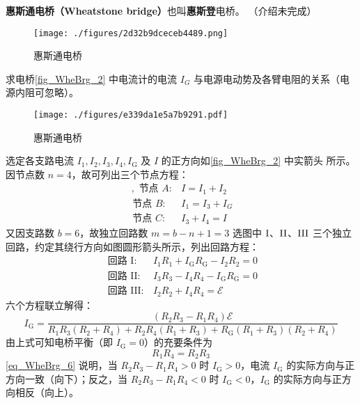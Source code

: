 

\textbf{惠斯通电桥（Wheatstone bridge）}也叫\textbf{惠斯登}电桥。 （介绍未完成）

\begin{figure}[ht]
\centering
\texttt{[image: ./figures/2d32b9dceceb4489.png]}
\caption{惠斯通电桥} \label{fig_WheBrg_1}
\end{figure}

求电桥\autoref{fig_WheBrg_2} 中电流计的电流 $I_G$ 与电源电动势及各臂电阻的关系（电源内阻可忽略）。
\begin{figure}[ht]
\centering
\texttt{[image: ./figures/e339da1e5a7b9291.pdf]}
\caption{惠斯通电桥} \label{fig_WheBrg_2}
\end{figure}

选定各支路电流 $I_{1}, I_{2}, I_{3}, I_{4}, I_{\mathrm{G}}$ 及 $I $ 的正方向如\autoref{fig_WheBrg_2} 中实箭头
所示。因节点数 $n = 4$，故可列出三个节点方程：
\begin{equation}
\begin{array}{ll}~,\text { 节点 } A: & I=I_{1}+I_{2} \\ \text { 节点 } B: & I_{1}=I_{3}+I_{G} \\ \text { 节点 } C: & I_{3}+I_{4}=I\end{array}
\end{equation}
又因支路数 $b=6$，故独立回路数 $m=b-n+1=3$ 选图中 $\rm I$、$\rm II$、$\rm III$ 三个独立回路，约定其绕行方向如图圆形箭头所示，列出回路方程：
\begin{equation}
\begin{array}{ll}\text { 回路 } \mathrm{I}: & I_{1} R_{1}+I_{\mathrm{G}} R_{\mathrm{G}}-I_{2} R_{2}=0 \\ \text { 回路 } \mathrm{II}: & I_{3} R_{3}-I_{4} R_{4}-I_{\mathrm{G}} R_{\mathrm{G}}=0 \\ \text { 回路 } \mathrm{III}  : & I_{2} R_{2}+I_{4} R_{4}=\mathscr{E}\end{array}
\end{equation}
六个方程联立解得：
\begin{equation} \label{eq_WheBrg_6}
I_{\mathrm{G}}=\frac{\left(R_{2} R_{3}-R_{1} R_{4}\right) \mathscr{E}}{{R}_{1} R_{3}\left(R_{2}+R_{4}\right)+R_{2} R_{4}\left(R_{1}+R_{3}\right)+R_{\mathrm{G}}\left(R_{1}+R_{3}\right)\left(R_{2}+R_{4}\right)}
\end{equation}
由上式可知电桥平衡（即 $I_\mathrm{G} = 0$）的充要条件为
\begin{equation}
R_{1} R_{4}=R_{2} R_{3}
\end{equation}
\autoref{eq_WheBrg_6} 说明，当 $R_{2} R_{3}-R_{1} R_{4}>0$ 时 $I_{\mathrm{G}}>0$，电流 $I_{\mathrm{G}}$ 的实际方向与正方向一致（向下）；反之，当 $R_{2} R_{3}-R_{1} R_{4}<0$ 时 $I_{\mathrm{G}}<0$，$I_{\mathrm{G}}$ 的实际方向与正方向相反（向上）。
